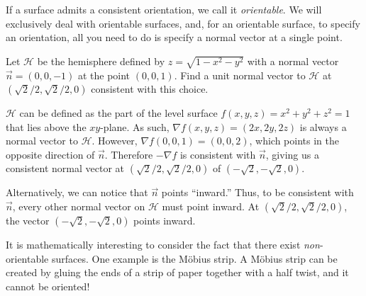 If a surface admits a consistent orientation, we call it \emph{orientable}.
We will exclusively deal with orientable surfaces, and, for an orientable surface,
to specify an orientation, all you need to do is specify a normal vector at a single point.

\begin{example}
	Let $\mathcal H$ be the hemisphere defined by $z=\sqrt{1 - x^2 - y^2}$ with
	a normal vector $\vec n=(0,0,-1)$ at the point $(0,0,1)$.  Find a unit normal
	vector to $\mathcal H$ at $(\sqrt{2}/2,\sqrt{2}/2,0)$ consistent with this choice.

	$\mathcal H$ can be defined as the part of the level surface $f(x,y,z)=x^2+y^2+z^2=1$
	that lies above the $xy$-plane.  As such, $\nabla f(x,y,z)=(2x,2y,2z)$ is always a normal
	vector to $\mathcal H$.  However, $\nabla f(0,0,1) = (0,0,2)$, which points in the opposite
	direction of $\vec n$.  Therefore $-\nabla f$ is consistent with $\vec n$, giving us a 
	consistent normal vector at $(\sqrt{2}/2,\sqrt{2}/2,0)$ of $(-\sqrt{2},-\sqrt{2},0)$.

	Alternatively, we can notice that $\vec n$ points ``inward.''  Thus, to be consistent with $\vec n$,
	every other normal vector on $\mathcal H$ must point inward.  At $(\sqrt{2}/2,\sqrt{2}/2,0)$,
	the vector $(-\sqrt{2},-\sqrt{2},0)$ points inward.
\end{example}

It is mathematically interesting to consider the fact that there exist \emph{non}-orientable
surfaces.  One example is the M\"obius strip.  A M\"obius strip can be created by gluing the
ends of a strip of paper together with a half twist, and it cannot be oriented!

\begin{center}
\end{center}

